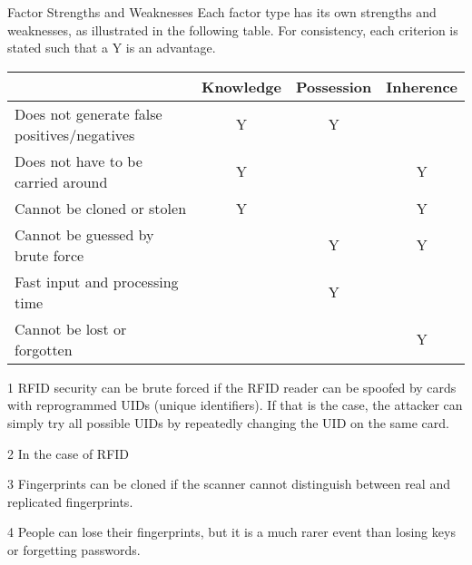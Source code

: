 \begin{frame}{Factor Strengths and Weaknesses}
Each factor type has its own strengths and weaknesses, as illustrated in the following table. For consistency, each criterion is stated such that a Y is an advantage.

\scriptsize{
\begin{table}[ht]
	\begin{threeparttable}
		\begin{tabular}{|l|c|c|c|}
			\hline		                                & Knowledge & Possession & Inherence  \\ \hline
			{\pause} Does not generate false positives/negatives & Y         & Y          &            \\
			{\pause} Does not have to be carried around          & Y         &            & Y          \\
			{\pause} Cannot be cloned or stolen                  & Y         &            & Y\tnote{3} \\
			{\pause} Cannot be guessed by brute force            &           & Y\tnote{1} & Y          \\
			{\pause} Fast input and processing time              &           & Y\tnote{2} &            \\
			{\pause} Cannot be lost or forgotten                 &           &            & Y\tnote{4} \\ \hline
		\end{tabular}
		\begin{tablenotes}
		    {\pause}\item[1] RFID security can be brute forced if the RFID reader can be spoofed by cards with reprogrammed UIDs (unique identifiers). If that is the case, the attacker can simply try all possible UIDs by repeatedly changing the UID on the same card.
            {\pause}\item[2] In the case of RFID
		    {\pause}\item[3] Fingerprints can be cloned if the scanner cannot distinguish between real and replicated fingerprints.
		    {\pause}\item[4] People can lose their fingerprints, but it is a much rarer event than losing keys or forgetting passwords.
		\end{tablenotes}
	\end{threeparttable}
\end{table}
}
\end{frame}


